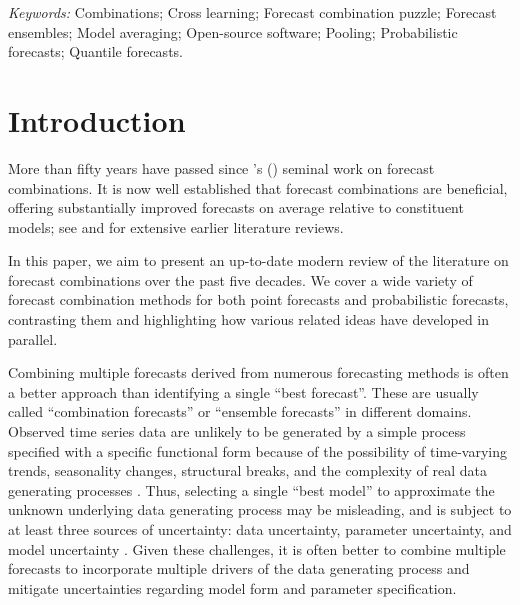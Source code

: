 \documentclass[11pt]{article}
\def\citeapos#1{\citeauthor{#1}'s (\citeyear{#1})}
\begin{document}
\noindent%
\textit{Keywords:}
  Combinations;
  Cross learning;
  Forecast combination puzzle;
  Forecast ensembles;
  Model averaging;
  Open-source software;
  Pooling;
  Probabilistic forecasts;
  Quantile forecasts.
\vfill

\newpage

\tableofcontents

\newpage

{}

\section{Introduction}
\label{sec:introduction}

More than fifty years have passed since \citeapos{Bates1969-yj} seminal work on forecast combinations. It is now well established that forecast combinations are beneficial, offering substantially improved forecasts on average relative to constituent models; see \citet{Clemen1989-fb} and \citet{Timmermann2006-en} for extensive earlier literature reviews.

In this paper, we aim to present an up-to-date modern review of the literature on forecast combinations over the past five decades. We cover a wide variety of forecast combination methods for both point forecasts and probabilistic forecasts, contrasting them and highlighting how various related ideas have developed in parallel.

Combining multiple forecasts derived from numerous forecasting methods is often a better approach than identifying a single ``best forecast''. These are usually called ``combination forecasts'' or ``ensemble forecasts'' in different domains. Observed time series data are unlikely to be generated by a simple process specified with a specific functional form because of the possibility of time-varying trends, seasonality changes, structural breaks, and the complexity of real data generating processes \citep{Clements1998-bu}. Thus, selecting a single ``best model'' to approximate the unknown underlying data generating process may be misleading, and is subject to at least three sources of uncertainty: data uncertainty, parameter uncertainty, and model uncertainty \citep{Petropoulos2018-fw,Kourentzes2019-na}. Given these challenges, it is often better to combine multiple forecasts to incorporate multiple drivers of the data generating process and mitigate uncertainties regarding model form and parameter specification.
\end{document}
